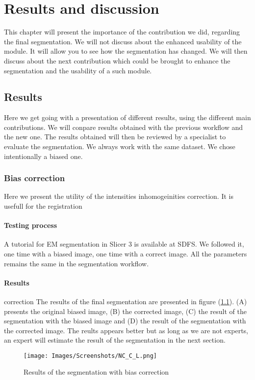 \chapter{Results and discussion}\label{sec:results}
This chapter will present the importance of the contribution we did, regarding the final segmentation. We will not discuss about the enhanced usability of the module. It will allow you to see how the segmentation has changed. We will then discuss about the next contribution which could be brought to enhance the segmentation and the usability of a such module. 

%
\section{Results}
%
Here we get going with a presentation of different results, using the different main contributions. We will conpare results obtained with the previous workflow and the new one. The results obtained will then be reviewed by a specialist to evaluate the segmentation. We always work with the same dataset. We chose intentionally a biased one.
%
\subsection{Bias correction}
%
Here we present the utility of the intensities inhomogeinities correction. It is usefull for the registration
%
\subsubsection{Testing process}
A tutorial for EM segmentation in Slicer 3 is available at SDFS. We followed it, one time with a biased image, one time with a correct image. All the parameters remains the same in the segmentation workflow.

%
\subsubsection{Results}correction
The results of the final segmentation are presented in figure (\ref{fig:NC_C_L}). (A) presents the original biased image, (B) the corrected image, (C) the result of the segmentation with the biased image and (D) the result of the segmentation with the corrected image. The reults appears better but as long as we are not experts, an expert will estimate the result of the segmentation in the next section.
%
  \begin{figure}\centering
  \texttt{[image: Images/Screenshots/NC\_C\_L.png]}
  \caption{Results of the segmentation with bias correction}\label{fig:NC_C_L}
  \end{figure}


